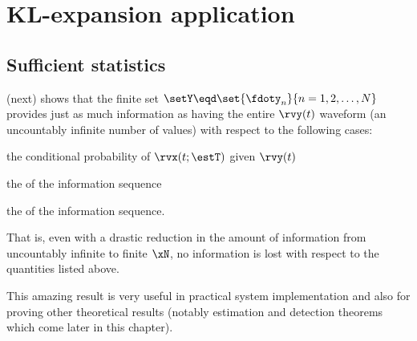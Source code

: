 \chapter{KL-expansion application}
\section{Sufficient statistics}
 (next) shows that the finite set
$\setY\eqd\set{\fdoty_n}{n=1,2,\ldots,N}$ provides just as
much information as having the entire $\rvy(t)$ waveform
(an uncountably infinite number of values)
with respect to the following cases:
\begin{enume}
   \item the conditional probability of $\rvx(t;\estT)$ given $\rvy(t)$
   \item the  of the information sequence
   \item the  of the information sequence.
\end{enume}
That is, even with a drastic reduction in the amount of information
from uncountably infinite to finite $\xN$,
no information is lost with respect to the quantities listed above.

This amazing result is very useful in practical system implementation
and also for proving other theoretical results
(notably estimation and detection theorems which come later
in this chapter).


